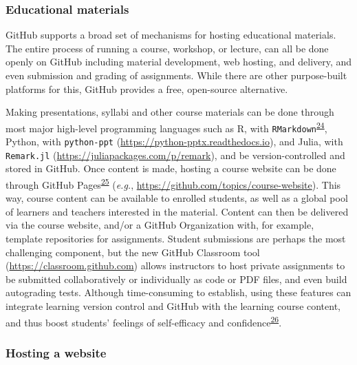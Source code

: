 \hypertarget{educational-materials}{%
\subsubsection{Educational materials}\label{educational-materials}}

GitHub supports a broad set of mechanisms for hosting educational materials.
The entire process of running a course, workshop, or lecture, can all be done openly on GitHub including material development, web hosting, and delivery, and even submission and grading of assignments.
While there are other purpose-built platforms for this, GitHub provides a free, open-source alternative.

Making presentations, syllabi and other course materials can be done through most major high-level programming languages such as R, with \texttt{RMarkdown}\textsuperscript{\protect\hyperlink{ref-QqMezOMg}{24}}, Python, with \texttt{python-ppt} (\url{https://python-pptx.readthedocs.io}), and Julia, with \texttt{Remark.jl} (\url{https://juliapackages.com/p/remark}), and be version-controlled and stored in GitHub.
Once content is made, hosting a course website can be done through GitHub Pages\textsuperscript{\protect\hyperlink{ref-MDQfMwCW}{25}} (\emph{e.g.}, \url{https://github.com/topics/course-website}).
This way, course content can be available to enrolled students, as well as a global pool of learners and teachers interested in the material.
Content can then be delivered via the course website, and/or a GitHub Organization with, for example, template repositories for assignments.
Student submissions are perhaps the most challenging component, but the new GitHub Classroom tool (\url{https://classroom.github.com}) allows instructors to host private assignments to be submitted collaboratively or individually as code or PDF files, and even build autograding tests.
Although time-consuming to establish, using these features can integrate learning version control and GitHub with the learning course content, and thus boost students' feelings of self-efficacy and confidence\textsuperscript{\protect\hyperlink{ref-dqrFjoSb}{26}}.

\hypertarget{hosting-a-website}{%
\subsubsection{Hosting a website}\label{hosting-a-website}}

